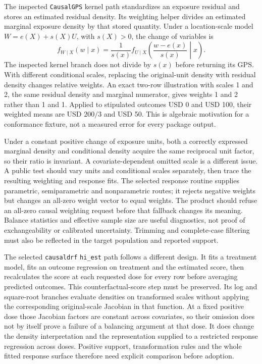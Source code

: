 The inspected \texttt{CausalGPS} kernel path standardizes an exposure residual
and stores an estimated residual density. Its weighting helper divides an
estimated marginal exposure density by that stored quantity. Under a
location-scale model $W=e(X)+s(X)U$, with $s(X)>0$, the change of variables is
\begin{equation}
 f_{W\mid X}(w\mid x)=
 \frac{1}{s(x)}f_{U\mid X}\!\left(\frac{w-e(x)}{s(x)}\middle|x\right).
 \label{exec20:rfx-jacobian}
\end{equation}
The inspected kernel branch does not divide by $s(x)$ before returning its GPS.
With different conditional scales, replacing the original-unit density with
residual density changes relative weights. An exact two-row illustration with
scales 1 and 2, the same residual density and marginal numerator, gives weights
1 and 2 rather than 1 and 1. Applied to stipulated outcomes USD 0 and USD 100,
their weighted means are USD $200/3$ and USD 50. This is algebraic motivation
for a conformance fixture, not a measured error for every package output.
\citep{exec20_rfx_causalgps,exec20_rfx_reference}

Under a constant positive change of exposure units, both a correctly expressed
marginal density and conditional density acquire the same reciprocal unit
factor, so their ratio is invariant. A covariate-dependent omitted scale is a
different issue. A public test should vary units and conditional scales separately,
then trace the resulting weighting and response fits. The selected response
routine supplies parametric, semiparametric and nonparametric routes; it rejects
negative weights but changes an all-zero weight vector to equal weights.
The product should refuse an all-zero causal weighting request before that
fallback changes its meaning. Balance statistics and effective sample size are
useful diagnostics, not proof of exchangeability or calibrated uncertainty.
Trimming and complete-case filtering must also be reflected in the target
population and reported support.
\citep{exec20_rfx_causalgps}

The selected \texttt{causaldrf} \texttt{hi\_est} path follows a different design.
It fits a treatment model, fits an outcome regression on treatment and the
estimated score, then recalculates the score at each requested dose for every
row before averaging predicted outcomes. This counterfactual-score step must
be preserved. Its log and square-root branches evaluate densities on transformed
scales without applying the corresponding original-scale Jacobian in that
function. At a fixed positive dose those Jacobian factors are constant across
covariates, so their omission does not by itself prove a failure of a balancing
argument at that dose. It does change the density interpretation and the
representation supplied to a restricted response regression across doses.
Positive support, transformation rules and the whole fitted response surface
therefore need explicit comparison before adoption.
\citep{exec20_rfx_causaldrf}


